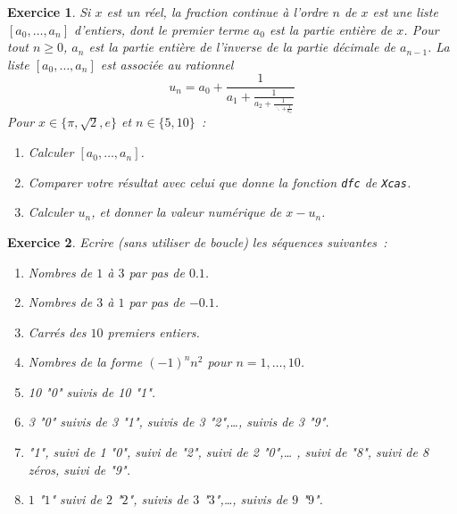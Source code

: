 \documentclass{article}
\newtheorem{exo}{Exercice}[section]
\begin{document}
\begin{exo}{\rm
Si $x$ est un r\'eel, la fraction continue \`a l'ordre $n$ de $x$ est
une liste $[a_0,\ldots,a_n]$ d'entiers, dont le premier terme $a_0$
est la partie enti\`ere de $x$. Pour tout $n\geq 0$, $a_n$ est la
partie enti\`ere de l'inverse de la partie d\'ecimale de $a_{n-1}$.
La liste $[a_0,\ldots,a_n]$ est associ\'ee au rationnel
$$
u_n = a_0+\frac{1}{\displaystyle{a_1+
\frac{1}{\displaystyle{a_2+\frac{1}{\ddots+\displaystyle{\frac{1}{a_n}}}}}}}
$$
Pour $x\in\{\pi,\sqrt{2}, e\}$ et $n\in \{5,10\}$~:
\begin{enumerate}
\item
Calculer $[a_0,\ldots,a_n]$.
\item
Comparer votre r\'esultat avec celui que donne la fonction \verb|dfc|
de {\tt Xcas}. 
\item
Calculer $u_n$, et donner la valeur num\'erique de $x-u_n$.
\end{enumerate}
}\end{exo}

\begin{exo}{\rm
Ecrire (sans utiliser de boucle) les s\'equences suivantes~:
\begin{enumerate}
\item
Nombres de $1$ \`a $3$ par pas de $0.1$.
\item
Nombres de $3$ \`a $1$ par pas de $-0.1$.
\item
Carr\'es des $10$ premiers entiers.
\item
Nombres de la forme $(-1)^n n^2$ pour $n=1,\ldots,10$.
\item 
10 "0" suivis de 10 "1".
\item 
3 "0" suivis de 3 "1", suivis de 3 "2",\ldots , 
suivis de 3 "9". 
\item
"1", suivi de 1 "0", suivi de "2", suivi de 2 "0",\ldots
, suivi de "8", suivi de 8 z\'eros, suivi de "9".
\item
$1$ "$1$" suivi de $2$ "$2$", suivis de $3$ "$3$",\ldots ,
suivis de $9$ "$9$".
\end{enumerate} 
}\end{exo}
\end{document}
